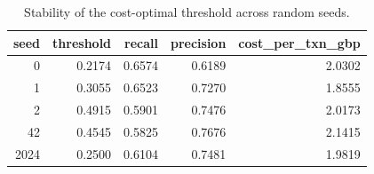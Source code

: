 \begin{table}
\caption{Stability of the cost-optimal threshold across random seeds.}
\label{tab:table7_seed_stability}
\begin{tabular}{rrrrr}
\toprule
seed & threshold & recall & precision & cost\_per\_txn\_gbp \\
\midrule
0 & 0.2174 & 0.6574 & 0.6189 & 2.0302 \\
1 & 0.3055 & 0.6523 & 0.7270 & 1.8555 \\
2 & 0.4915 & 0.5901 & 0.7476 & 2.0173 \\
42 & 0.4545 & 0.5825 & 0.7676 & 2.1415 \\
2024 & 0.2500 & 0.6104 & 0.7481 & 1.9819 \\
\bottomrule
\end{tabular}
\end{table}
